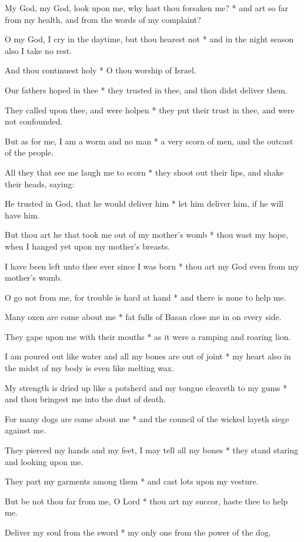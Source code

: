 My God, my God, look upon me, why hast thou forsaken me? * and art so far from my health, and from the words of my complaint?

O my God, I cry in the daytime, but thou hearest not * and in the night season also I take no rest.

And thou continuest holy * O thou worship of Israel.

Our fathers hoped in thee * they trusted in thee, and thou didst deliver them.

They called upon thee, and were holpen * they put their trust in thee, and were not confounded.

But as for me, I am a worm and no man * a very scorn of men, and the outcast of the people.

All they that see me laugh me to scorn * they shoot out their lips, and shake their heads, saying:

He trusted in God, that he would deliver him * let him deliver him, if he will have him.

But thou art he that took me out of my mother's womb * thou wast my hope, when I hanged yet upon my mother's breasts.

I have been left unto thee ever since I was born * thou art my God even from my mother's womb.

O go not from me, for trouble is hard at hand * and there is none to help me.

Many oxen are come about me * fat fulls of Basan close me in on every side.

They gape upon me with their mouths * as it were a ramping and roaring lion.

I am poured out like water and all my bones are out of joint * my heart also in the midst of my body is even like melting wax.

My strength is dried up like a potsherd and my tongue cleaveth to my gums * and thou bringest me into the dust of death.

For many dogs are come about me * and the council of the wicked layeth siege against me.

They pierced my hands and my feet, I may tell all my bones * they stand staring and looking upon me.

They part my garments among them * and cast lots upon my vesture.

But be not thou far from me, O Lord * thou art my succor, haste thee to help me.

Deliver my soul from the sword * my only one from the power of the dog.

